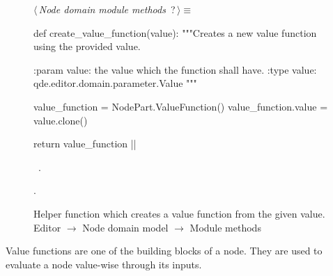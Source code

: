 \documentclass[%
    a4paper,    %
    justified,  %
    nobib,      %
    openany     %
]{tufte-book}
\makeatletter
\renewcommand{\label}[1]{\@tufte@label{##1}}%
\makeatother
\begin{document}
\begin{figure}
\begin{flushleft} \small
\begin{minipage}{\linewidth}\label{scrap112}\raggedright\small
{} $\langle\,${\itshape Node domain module methods}\nobreak\ {\footnotesize {?}}$\,\rangle\equiv$
\vspace{-1ex}
\begin{pythoncode}
def create_value_function(value):
    """Creates a new value function using the provided value.

    :param value: the value which the function shall have.
    :type  value: qde.editor.domain.parameter.Value
    """

    value_function = NodePart.ValueFunction()
    value_function.value = value.clone()

    return value_function
|\NWsep|
\end{pythoncode}
\vspace{1.5ex}
\footnotesize
\begin{list}{}{\setlength{\itemsep}{-\parsep}\setlength{\itemindent}{-\leftmargin}}
\item \NWtxtMacroDefBy\ .
\item {\NWtxtMacroNoRef}.

\item{}
\end{list}
\end{minipage}\vspace{4ex}
\end{flushleft}
\caption{Helper function which creates a value function from the given value.
  \newline{}\newline{}Editor $\rightarrow$ Node domain model $\rightarrow$
  Module methods}
\label{editor:lst:node-domain-model:module-methods:create-value-function}
\end{figure}

 Value functions are
one of the building blocks of a node. They are used to evaluate a node
value-wise through its inputs.
\end{document}
